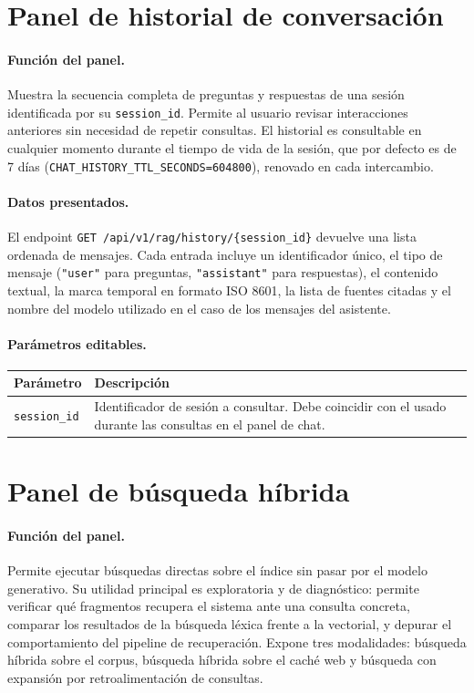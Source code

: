 \documentclass[11pt]{article}
\begin{document}
\section{Panel de historial de conversación}

\paragraph{Función del panel.}
Muestra la secuencia completa de preguntas y respuestas de una sesión identificada por su
\texttt{session\_id}. Permite al usuario revisar interacciones anteriores sin necesidad de
repetir consultas. El historial es consultable en cualquier momento durante el tiempo de vida
de la sesión, que por defecto es de 7 días (\texttt{CHAT\_HISTORY\_TTL\_SECONDS=604800}),
renovado en cada intercambio.

\paragraph{Datos presentados.}
El endpoint \texttt{GET /api/v1/rag/history/\{session\_id\}} devuelve una lista ordenada de
mensajes. Cada entrada incluye un identificador único, el tipo de mensaje (\texttt{"user"} para
preguntas, \texttt{"assistant"} para respuestas), el contenido textual, la marca temporal en
formato ISO 8601, la lista de fuentes citadas y el nombre del modelo utilizado en el caso de
los mensajes del asistente.

\paragraph{Parámetros editables.}

\begin{center}
\begin{tabular}{lp{9cm}}
\toprule
\textbf{Parámetro} & \textbf{Descripción} \\
\midrule
\texttt{session\_id} & Identificador de sesión a consultar. Debe coincidir con el usado
                       durante las consultas en el panel de chat. \\
\bottomrule
\end{tabular}
\end{center}

\section{Panel de búsqueda híbrida}

\paragraph{Función del panel.}
Permite ejecutar búsquedas directas sobre el índice sin pasar por el modelo generativo.
Su utilidad principal es exploratoria y de diagnóstico: permite verificar qué fragmentos
recupera el sistema ante una consulta concreta, comparar los resultados de la búsqueda
léxica frente a la vectorial, y depurar el comportamiento del pipeline de recuperación.
Expone tres modalidades: búsqueda híbrida sobre el corpus, búsqueda híbrida sobre el caché
web y búsqueda con expansión por retroalimentación de consultas.
\end{document}

